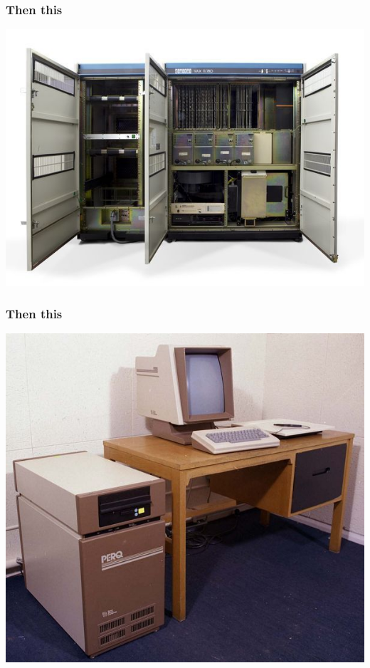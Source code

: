 \documentclass[rgb,dvipsnames]{beamer}
\begin{document}
\begin{frame}
  \frametitle{Then this}
  \begin{center}
    \includegraphics[width=\textwidth]{img/vax.jpg}
  \end{center}
\end{frame}

\begin{frame}
  \frametitle{Then this}
  \begin{center}
    \includegraphics[width=\textwidth]{img/early-workstation.jpg}
  \end{center}
\end{frame}
\end{document}
